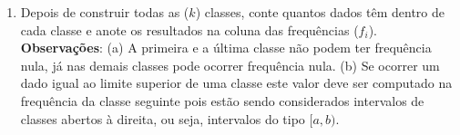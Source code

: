 \documentclass[11pt,fleqn]{book} %
\begin{document}
\begin{enumerate}
	\item Depois de construir todas as ($k$) classes, conte quantos dados têm dentro de cada classe e anote os resultados na coluna das frequências ($f_i$). \\
	
	{\bf Observações}: (a) A primeira e a última classe não podem ter frequência nula, já nas demais classes pode ocorrer frequência nula. (b) Se ocorrer um dado igual ao limite superior de uma classe este valor deve ser computado na frequência da classe seguinte pois estão sendo considerados intervalos de classes abertos à direita, ou seja, intervalos do tipo $[a,b)$. \\
	
\end{enumerate}
\end{document}
